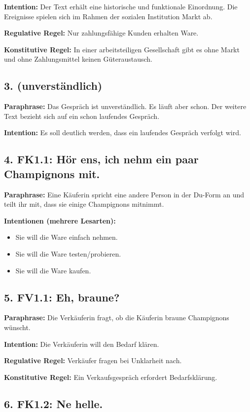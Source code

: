 \documentclass[11pt]{article}
\begin{document}
\textbf{Intention:} Der Text erhält eine historische und funktionale Einordnung. Die Ereignisse spielen sich im Rahmen der sozialen Institution Markt ab.

\textbf{Regulative Regel:} Nur zahlungsfähige Kunden erhalten Ware.

\textbf{Konstitutive Regel:} In einer arbeitsteiligen Gesellschaft gibt es ohne Markt und ohne Zahlungsmittel keinen Güteraustausch.

\subsection*{3. (unverständlich)}

\textbf{Paraphrase:} Das Gespräch ist unverständlich. Es läuft aber schon. Der weitere Text bezieht sich auf ein schon laufendes Gespräch.

\textbf{Intention:} Es soll deutlich werden, dass ein laufendes Gespräch verfolgt wird.

\subsection*{4. FK1.1: Hör ens, ich nehm ein paar Champignons mit.}

\textbf{Paraphrase:} Eine Käuferin spricht eine andere Person in der Du-Form an und teilt ihr mit, dass sie einige Champignons mitnimmt.

\textbf{Intentionen (mehrere Lesarten):}
\begin{itemize}
    \item Sie will die Ware einfach nehmen.
    \item Sie will die Ware testen/probieren.
    \item Sie will die Ware kaufen.
\end{itemize}

\subsection*{5. FV1.1: Eh, braune?}

\textbf{Paraphrase:} Die Verkäuferin fragt, ob die Käuferin braune Champignons wünscht.

\textbf{Intention:} Die Verkäuferin will den Bedarf klären.

\textbf{Regulative Regel:} Verkäufer fragen bei Unklarheit nach.

\textbf{Konstitutive Regel:} Ein Verkaufsgespräch erfordert Bedarfsklärung.

\subsection*{6. FK1.2: Ne helle.}
\end{document}
